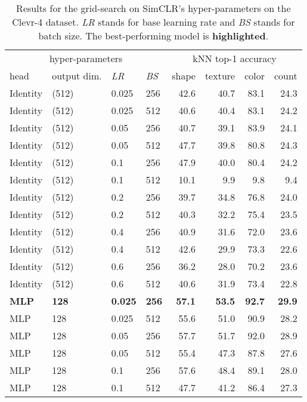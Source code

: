 \begin{table}[]
    \centering
    \caption{Results for the grid-search on SimCLR's hyper-parameters on the Clevr-4 dataset. \textit{LR} stands for base learning rate and \textit{BS} stands for batch size. The best-performing model is \textbf{highlighted}.}
    \label{tab:tuning_simclr}
    \vskip 0.15in
    \begin{tabular}{llll rrrr}
        \toprule
        \multicolumn{4}{c}{hyper-parameters} & \multicolumn{4}{c}{kNN top-1 accuracy} \\ 
        head & output dim. & \textit{LR} & \textit{BS} & shape & texture & color & count \\
        \midrule 
        Identity & (512) & 0.025 & 256 & 42.6 & 40.7 & 83.1 & 24.3 \\
        Identity & (512) & 0.025 & 512 & 40.6 & 40.4 & 83.1 & 24.2 \\
        Identity & (512) & 0.05 & 256 & 40.7 & 39.1 & 83.9 & 24.1 \\
        Identity & (512) & 0.05 & 512 & 47.7 & 39.8 & 80.8 & 24.3 \\
        Identity & (512) & 0.1 & 256 & 47.9 & 40.0 & 80.4 & 24.2 \\
        Identity & (512) & 0.1 & 512 & 10.1 & 9.9 & 9.8 & 9.4 \\
        Identity & (512) & 0.2 & 256 & 39.7 & 34.8 & 76.8 & 24.0 \\
        Identity & (512) & 0.2 & 512 & 40.3 & 32.2 & 75.4 & 23.5 \\
        Identity & (512) & 0.4 & 256 & 40.9 & 31.6 & 72.0 & 23.6 \\
        Identity & (512) & 0.4 & 512 & 42.6 & 29.9 & 73.3 & 22.6 \\
        Identity & (512) & 0.6 & 256 & 36.2 & 28.0 & 70.2 & 23.6 \\
        Identity & (512) & 0.6 & 512 & 40.6 & 31.9 & 73.4 & 22.8 \\
        \textbf{MLP} & \textbf{128} & \textbf{0.025} & \textbf{256} & \textbf{57.1} & \textbf{53.5} & \textbf{92.7} & \textbf{29.9} \\
        MLP & 128 & 0.025 & 512 & 55.6 & 51.0 & 90.9 & 28.2 \\
        MLP & 128 & 0.05 & 256 & 57.7 & 51.7 & 92.0 & 28.9 \\
        MLP & 128 & 0.05 & 512 & 55.4 & 47.3 & 87.8 & 27.6 \\
        MLP & 128 & 0.1 & 256 & 57.6 & 48.4 & 89.1 & 28.0 \\
        MLP & 128 & 0.1 & 512 & 47.7 & 41.2 & 86.4 & 27.3 \\

\end{tabular}
\end{table}
